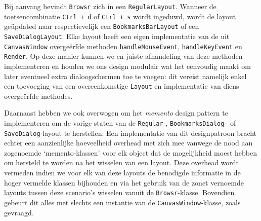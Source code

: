\documentclass[12pt]{article}
\begin{document}
Bij aanvang bevindt \texttt{Browsr} zich in een \texttt{RegularLayout}. Wanneer de toetsencombinatie \texttt{Ctrl + d} of \texttt{Ctrl + s} wordt ingeduwd, wordt de layout geüpdated naar respectievelijk een \texttt{BookmarksBarLayout} of een \texttt{SaveDialogLayout}. Elke layout heeft een eigen implementatie van de uit \texttt{CanvasWindow} overgeërfde methoden \texttt{handleMouseEvent}, \texttt{handleKeyEvent} en \texttt{Render}. Op deze manier kunnen we en juiste afhandeling van deze methoden implementeren en houden we ons design modulair wat het eenvoudig maakt om later eventueel extra dialoogschermen toe te voegen: dit vereist namelijk enkel een toevoeging van een overeenkomstige \texttt{Layout} en implementatie van diens overgeërfde methodes.

Daarnaast hebben we ook overwogen om het \textit{memento} design pattern te implementeren om de vorige staten van de \texttt{Regular}-, \texttt{BookmarksDialog-} of \texttt{SaveDialog}-layout te herstellen. Een implementatie van dit designpatroon bracht echter een aanzienlijke hoeveelheid overhead met zich mee vanwege de nood aan zogenoemde `memento-klassen' voor elk object dat de mogelijkheid moest hebben om hersteld te worden na het wisselen van een layout. Deze overhead wordt vermeden indien we voor elk van deze layouts de benodigde informatie in de hoger vermelde klassen bijhouden en via het gebruik van de zonet vernoemde layouts tussen deze scenario's wisselen vanuit de \texttt{Browsr}-klasse. Bovendien gebeurt dit alles met slechts een instantie van de \texttt{CanvasWindow}-klasse, zoals gevraagd.
\end{document}
